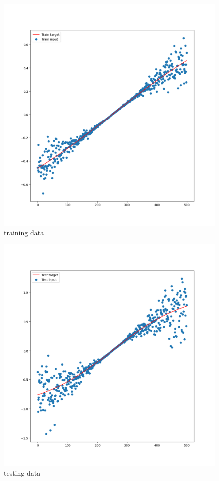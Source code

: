 \documentclass[11pt]{article}
\begin{document}
\begin{figure}[htbp]
\centering
\includegraphics[width=.9\linewidth]{./train.png}
\caption{training data}
\end{figure}
\begin{figure}[htbp]
\centering
\includegraphics[width=.9\linewidth]{./test.png}
\caption{testing data}
\end{figure}
\end{document}
